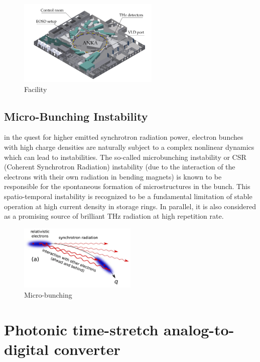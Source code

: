 \begin{figure}[H]
	\centering
	\includegraphics[width = 0.6\textwidth]{chap/02-theory/img/kara.png}
	\caption{Facility \cite{rota2018}}
	\label{fig:kara}
\end{figure}

\subsection{Micro-Bunching Instability}

in the quest for higher emitted synchrotron radiation
power, electron bunches with high charge densities are naturally subject to
a complex nonlinear dynamics which can lead to instabilities. The so-called microbunching
instability or CSR (Coherent Synchrotron Radiation) instability (due
to the interaction of the electrons with their own radiation in bending magnets) is
known to be responsible for the spontaneous formation of microstructures in the
bunch. This spatio-temporal instability is recognized to be a fundamental limitation
of stable operation at high current density in storage rings. In parallel, it
is also considered as a promising source of brilliant THz radiation at high repetition
rate.
\begin{figure}[H]
	\centering
	\includegraphics[width = 0.5\textwidth]{chap/02-theory/img/csr.png}
	\caption{Micro-bunching \cite{Bielawski2019}}
	\label{fig:microBunch}
\end{figure}

\newpage 
\section{Photonic time-stretch analog-to-digital converter}










